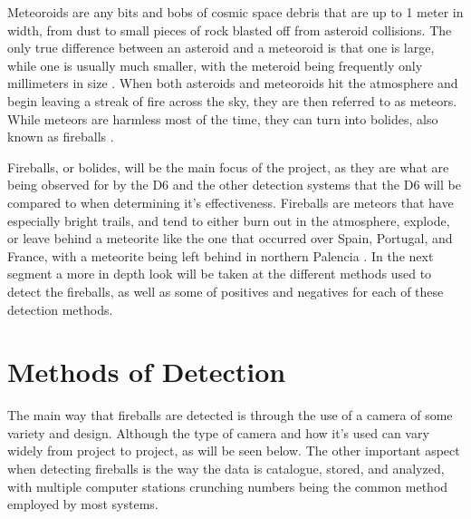 Meteoroids are any bits and bobs of cosmic space debris that are up to 1 meter in width, from dust to small pieces of rock blasted off from asteroid collisions. 
The only true difference between an asteroid and a meteoroid is that one is large, while one is usually much smaller, with the meteroid being frequently only millimeters in size \cite{atkinson_2018}. 
When both asteroids and meteoroids hit the atmosphere and begin leaving a streak of fire across the sky, they are then referred to as meteors. 
While meteors are harmless most of the time, they can turn into bolides, also known as fireballs \cite{atkinson_2018}. 

Fireballs, or bolides, will be the main focus of the project, as they are what are being observed for by the D6 and the other detection systems that the D6 will be compared to when determining it's effectiveness. 
Fireballs are meteors that have especially bright trails, and tend to either burn out in the atmosphere, explode, or leave behind a meteorite like the one that occurred over Spain, Portugal, and France, with a meteorite being left behind in northern Palencia \cite{Villabeto}. 
In the next segment a more in depth look will be taken at the different methods used to detect the fireballs, as well as some of positives and negatives for each of these detection methods.

\section{Methods of Detection}
The main way that fireballs are detected is through the use of a camera of some variety and design.
Although the type of camera and how it's used can vary widely from project to project, as will be seen below.
The other important aspect when detecting fireballs is the way the data is catalogue, stored, and analyzed, with multiple computer stations crunching numbers being the common method employed by most systems.
